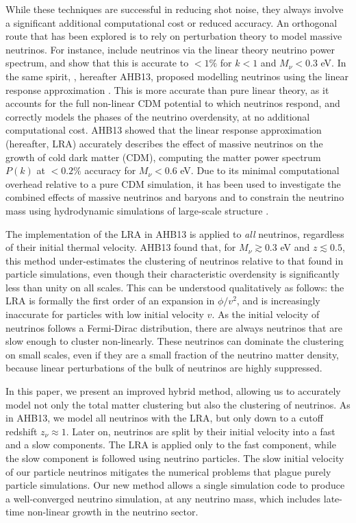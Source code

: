 \documentclass[useAMS, usenatbib]{mnras}
\begin{document}
While these techniques are successful in reducing shot noise, they always involve a significant additional computational cost or reduced accuracy. An orthogonal route that has been explored is to rely on perturbation theory to model massive neutrinos. For instance, \cite{Brandbyge_2009} include neutrinos via the linear theory neutrino power spectrum, and show that this is accurate to $< 1\%$ for $k < 1$ and $M_\nu < 0.3$ eV. In the same spirit, \cite{AHB}, hereafter AHB13, proposed modelling neutrinos using the linear response approximation \citep{Bond_1980, Ma_1994}. This is more accurate than pure linear theory, as it accounts for the full non-linear CDM potential to which neutrinos respond, and correctly models the phases of the neutrino overdensity, at no additional computational cost.
AHB13 showed that the linear response approximation (hereafter, LRA) accurately describes the effect of massive neutrinos on the growth of cold dark matter (CDM), computing the matter power spectrum $P(k)$ at $ < 0.2\%$ accuracy for $M_\nu < 0.6$ eV. Due to its minimal computational overhead relative to a pure CDM simulation, it has been used to investigate the combined effects of massive neutrinos and baryons \citep{Mummery_2017} and to constrain the neutrino mass using hydrodynamic simulations of large-scale structure \citep{McCarthy_2018, McCarthy_2017}.

The implementation of the LRA in AHB13 is applied to \emph{all} neutrinos, regardless of their initial thermal velocity. AHB13 found that, for $M_\nu \gtrsim 0.3$ eV and $z \lesssim 0.5$, this method under-estimates the clustering of neutrinos relative to that found in particle simulations, even though their characteristic overdensity is significantly less than unity on all scales. This can be understood qualitatively as follows: the LRA is formally the first order of an expansion in $\phi/v^2$, and is increasingly inaccurate for particles with low initial velocity $v$. As the initial velocity of neutrinos follows a Fermi-Dirac distribution, there are always neutrinos that are slow enough to cluster non-linearly. These neutrinos can dominate the clustering on small scales, even if they are a small fraction of the neutrino matter density, because linear perturbations of the bulk of neutrinos are highly suppressed.

In this paper, we present an improved hybrid method, allowing us to accurately model not only the total matter clustering but also the clustering of neutrinos.
As in AHB13, we model all neutrinos with the LRA, but only down to a cutoff redshift $z_\nu \approx 1$. Later on, neutrinos are split by their initial velocity into a fast and a slow components. The LRA is applied only to the fast component, while the slow component is followed using neutrino particles. The slow initial velocity of our particle neutrinos mitigates the numerical problems that plague purely particle simulations. Our new method allows a single simulation code to produce a well-converged neutrino simulation, at any neutrino mass, which includes late-time non-linear growth in the neutrino sector.
\end{document}
